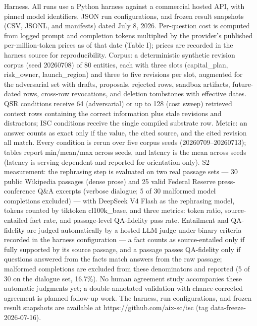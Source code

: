 \documentclass[conference,a4paper]{IEEEtran}
\begin{document}
Harness. All runs use a Python harness against a commercial hosted API, with pinned model identifiers, JSON run configurations, and frozen result snapshots (CSV, JSONL, and manifests) dated July 8, 2026. Per-question cost is computed from logged prompt and completion tokens multiplied by the provider's published per-million-token prices as of that date (Table I); prices are recorded in the harness source for reproducibility. Corpus: a deterministic synthetic revision corpus (seed 20260708) of 80 entities, each with three slots (capital\_plan, risk\_owner, launch\_region) and three to five revisions per slot, augmented for the adversarial set with drafts, proposals, rejected rows, sandbox artifacts, future-dated rows, cross-row revocations, and deletion tombstones with effective dates. QSR conditions receive 64 (adversarial) or up to 128 (cost sweep) retrieved context rows containing the correct information plus stale revisions and distractors; ISC conditions receive the single compiled substrate row. Metric: an answer counts as exact only if the value, the cited source, and the cited revision all match. Every condition is rerun over five corpus seeds (20260709--20260713); tables report min/mean/max across seeds, and latency is the mean across seeds (latency is serving-dependent and reported for orientation only). S2 measurement: the rephrasing step is evaluated on two real passage sets --- 30 public Wikipedia passages (dense prose) and 25 valid Federal Reserve press-conference Q\&A excerpts (verbose dialogue; 5 of 30 malformed model completions excluded) --- with DeepSeek V4 Flash as the rephrasing model, tokens counted by tiktoken cl100k\_base, and three metrics: token ratio, source-entailed fact rate, and passage-level QA-fidelity pass rate. Entailment and QA-fidelity are judged automatically by a hosted LLM judge under binary criteria recorded in the harness configuration --- a fact counts as source-entailed only if fully supported by its source passage, and a passage passes QA-fidelity only if questions answered from the facts match answers from the raw passage; malformed completions are excluded from these denominators and reported (5 of 30 on the dialogue set, 16.7\%). No human agreement study accompanies these automatic judgments yet; a double-annotated validation with chance-corrected agreement is planned follow-up work. The harness, run configurations, and frozen result snapshots are available at https://github.com/aix-sc/isc (tag data-freeze-2026-07-16).
\end{document}
